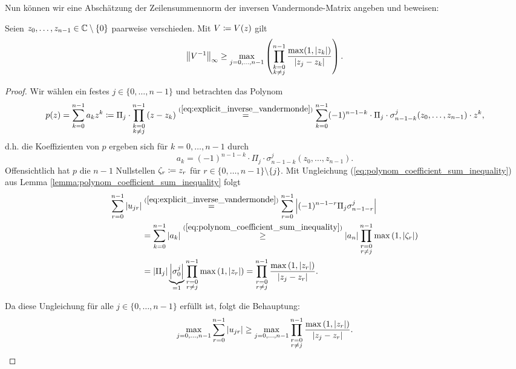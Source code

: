 \noindent Nun können wir eine Abschätzung der Zeilensummennorm der inversen
Vandermonde-Matrix angeben und beweisen:
\begin{theorem}
  \label{thm:inverse_vandermonde_lower_bound}
  Seien $z_0, \dots, z_{n-1} \in \mathbb{C}\setminus\{0\}$ paarweise verschieden.
  Mit $V \coloneqq V \! \left( z \right)$ gilt
  \begin{equation}
    \label{eq:inverse_vandermonde_lower_bound}
    \left\lVert V^{-1} \right\rVert_{\infty}
    \geq \max_{j = 0, \dots, n-1} \left( \prod_{\substack{k = 0\\ k \neq j}}^{n-1} \frac{\max(1, \left\lvert z_k \right\rvert)}{\left\lvert z_j - z_k \right\rvert} \right).
  \end{equation}
\end{theorem}
\begin{proof}
    \noindent Wir wählen ein festes
    $j \in \{0, \dots, n-1\}$ und betrachten das Polynom
    \[
        p(z) = \sum_{k=0}^{n-1} a_k z^k
        \coloneqq \Pi_j \cdot \prod_{\substack{k=0\\ k \neq j}}^{n-1} \left( z - z_k \right)
        \overset{(\ref{eq:explicit_inverse_vandermonde})}{=} \sum_{k=0}^{n-1} (-1)^{n-1-k} \cdot \Pi_j \cdot \sigma_{n-1-k}^j(z_0, \dots, z_{n-1}) \cdot z^k,
    \]
    d.h. die Koeffizienten von $p$ ergeben sich für $k = 0, \dots, n-1$ durch
    \[
        a_k = (-1)^{n-1-k} \cdot \Pi_j \cdot \sigma_{n-1-k}^j(z_0, \dots, z_{n-1}).
    \]
    Offensichtlich hat $p$ die $n-1$ Nullstellen
    $\zeta_r \coloneqq z_r$ für $r \in \{0,\dots,n-1\} \setminus \{j\}$.
    Mit Ungleichung (\ref{eq:polynom_coefficient_sum_inequality}) aus Lemma
    \ref{lemma:polynom_coefficient_sum_inequality} folgt
    \[
        \begin{split}
            \sum_{r=0}^{n-1} \left\lvert u_{jr} \right\rvert
            &\overset{(\ref{eq:explicit_inverse_vandermonde})}{=}
            \sum_{r=0}^{n-1} \left\lvert (-1)^{n-1-r} \Pi_j \sigma_{n-1-r}^j \right\rvert\\
            &= \sum_{k=0}^{n-1} \left\lvert a_k \right\rvert
            \overset{(\ref{eq:polynom_coefficient_sum_inequality})}{\geq}
                \left\lvert a_{n} \right\rvert \prod_{\substack{r=0\\ r \neq j}}^{n-1} \max \left(1, \left\lvert \zeta_r \right\rvert \right)\\
            &= \left\lvert \Pi_j \right\rvert \underbrace{\left\lvert \sigma_0^j \right\rvert}_{=1} \prod_{\substack{r=0\\ r \neq j}}^{n-1} \max \left(1, \left\lvert z_r \right\rvert \right)
            = \prod_{\substack{r=0\\ r \neq j}}^{n-1} \frac{\max \left(1, \left\lvert z_r \right\rvert \right)}{\left\lvert z_j - z_r \right\rvert}.
        \end{split}
    \]

    \noindent Da diese Ungleichung für alle $j \in \{0, \dots, n-1\}$ erfüllt
    ist, folgt die Behauptung:
    \[
        \max_{j = 0, \dots, n-1} \sum_{r=0}^{n-1} \left\lvert u_{jr} \right\rvert
        \geq \max_{j = 0, \dots, n-1} \prod_{\substack{r=0\\ r \neq j}}^{n-1} \frac{\max \left(1, \left\lvert z_r \right\rvert \right)}{\left\lvert z_j - z_r \right\rvert}.
    \]
\end{proof}

